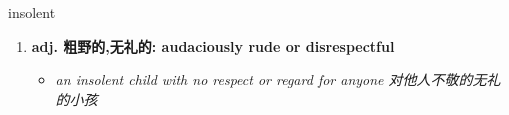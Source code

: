 
\begin{frame}
{\huge insolent}
\begin{center}
\begin{enumerate}\Large
  \item \textbf{adj. 粗野的,无礼的: audaciously rude or disrespectful}
  \begin{itemize}
    \item \em{\Large{an insolent child with no respect or regard for anyone 对他人不敬的无礼的小孩}}
  \end{itemize}
\end{enumerate}
\end{center}
\end{frame}
